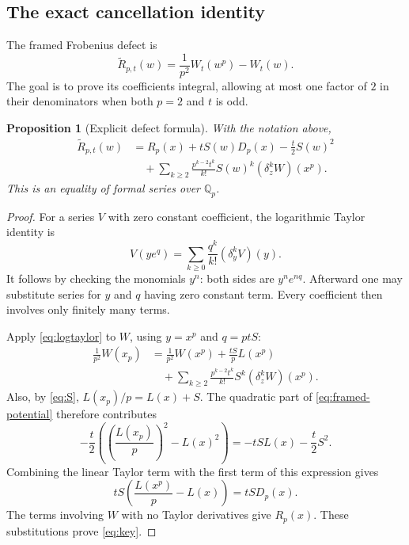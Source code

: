\documentclass[11pt,letterpaper]{article}
\numberwithin{equation}{section}
\newtheorem{proposition}[proposition]{Proposition}
\theoremstyle{definition}
\theoremstyle{remark}
\newcommand{\Qp}{\mathbb Q_p}
\begin{document}
\subsection{The exact cancellation identity}
The framed Frobenius defect is
\begin{equation}\label{eq:Rtilde}
 \widetilde R_{p,t}(w)=\frac1{p^2}W_t(w^p)-W_t(w).
\end{equation}
The goal is to prove its coefficients integral, allowing at most one
factor of $2$ in their denominators when both $p=2$ and $t$ is odd.

\begin{proposition}[Explicit defect formula]\label{prop:defect-identity}
With the notation above,
\begin{equation}\label{eq:key}
\boxed{\begin{aligned}
 \widetilde R_{p,t}(w)
 &=R_p(x)+tS(w)D_p(x)-\frac t2S(w)^2\\
 &\quad+\sum_{k\ge2}\frac{p^{k-2}t^k}{k!}S(w)^k
                  (\delta_z^kW)(x^p).
\end{aligned}}
\end{equation}
This is an equality of formal series over $\Qp$.
\end{proposition}
\begin{proof}
For a series $V$ with zero constant coefficient, the logarithmic Taylor
identity is
\begin{equation}\label{eq:logtaylor}
 V(ye^q)=\sum_{k\ge0}\frac{q^k}{k!}(\delta_y^kV)(y).
\end{equation}
It follows by checking the monomials $y^n$: both sides are $y^ne^{nq}$.
Afterward one may substitute series for $y$ and $q$ having zero constant
term. Every coefficient then involves only finitely many terms.

Apply \eqref{eq:logtaylor} to $W$, using $y=x^p$ and $q=ptS$:
\begin{align*}
 \frac1{p^2}W(x_p)
 &=\frac1{p^2}W(x^p)+\frac{tS}{p}L(x^p)\\
 &\quad+\sum_{k\ge2}\frac{p^{k-2}t^k}{k!}S^k
                          (\delta_z^kW)(x^p).
\end{align*}
Also, by \eqref{eq:S}, $L(x_p)/p=L(x)+S$. The quadratic part of
\eqref{eq:framed-potential} therefore contributes
\[
 -\frac t2\left(\left(\frac{L(x_p)}p\right)^2-L(x)^2\right)
 =-tS L(x)-\frac t2S^2.
\]
Combining the linear Taylor term with the first term of this expression
gives
\[
 tS\left(\frac{L(x^p)}p-L(x)\right)=tS D_p(x).
\]
The terms involving $W$ with no Taylor derivatives give $R_p(x)$.
These substitutions prove \eqref{eq:key}.
\end{proof}
\end{document}
